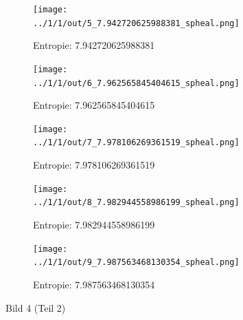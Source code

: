 \begin{figure}
	\centering

	\begin{subfigure}{0.25\textwidth}
		\texttt{[image: ../1/1/out/5\_7.942720625988381\_spheal.png]}
		\caption{Entropie: 7.942720625988381}
	\end{subfigure}

	\begin{subfigure}{0.25\textwidth}
		\texttt{[image: ../1/1/out/6\_7.962565845404615\_spheal.png]}
		\caption{Entropie: 7.962565845404615}
	\end{subfigure}

	\begin{subfigure}{0.25\textwidth}
		\texttt{[image: ../1/1/out/7\_7.978106269361519\_spheal.png]}
		\caption{Entropie: 7.978106269361519}
	\end{subfigure}

	\begin{subfigure}{0.25\textwidth}
		\texttt{[image: ../1/1/out/8\_7.982944558986199\_spheal.png]}
		\caption{Entropie: 7.982944558986199}
	\end{subfigure}

	\begin{subfigure}{0.25\textwidth}
		\texttt{[image: ../1/1/out/9\_7.987563468130354\_spheal.png]}
		\caption{Entropie: 7.987563468130354}
	\end{subfigure}

	\caption{Bild 4 (Teil 2)}
\end{figure}

